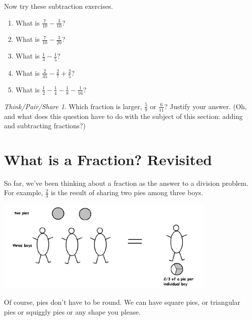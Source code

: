 \documentclass[10pt, reqno]{amsart}
\theoremstyle{remark}
\newtheorem*{thinkpair*}{Think/Pair/Share}
\theoremstyle{definition}
\numberwithin{equation}{section}  %
\begin{document}
Now try these subtraction exercises.
\begin{enumerate}
\addtocounter{enumi}{6}

\item
What is $\frac 7{10} - \frac 3{10}$?\\

\item
What is $\frac 7{10} - \frac {3}{20}$?\\

\item
What is $\frac 1 3 - \frac 1{5}$?\\

\item
What is $\frac 2 {35} - \frac 2 7 + \frac 2 5 $?\\

\item
What is $\frac 1 2 - \frac 1 4 - \frac 1 8 - \frac 1 {16}$?\\
\end{enumerate}


\begin{thinkpair*}
Which fraction is larger, $\frac 5 9 $ or $\frac 6{11}$?  Justify your answer.
(Oh, and what does this question have to do with the subject of this section: adding and subtracting fractions?)
\end{thinkpair*}





\section{What is a Fraction? Revisited}
So far, we've been thinking about a fraction as the answer to a division problem.  For example,  $\frac 2 3$ is the result of sharing two pies among three boys.

   \begin{center}
\includegraphics[height = 4.5cm]{2pies3boys}
\end{center}

Of course, pies don't have to be round.  We can have square pies, or triangular pies or squiggly pies or any shape you please.
\end{document}
